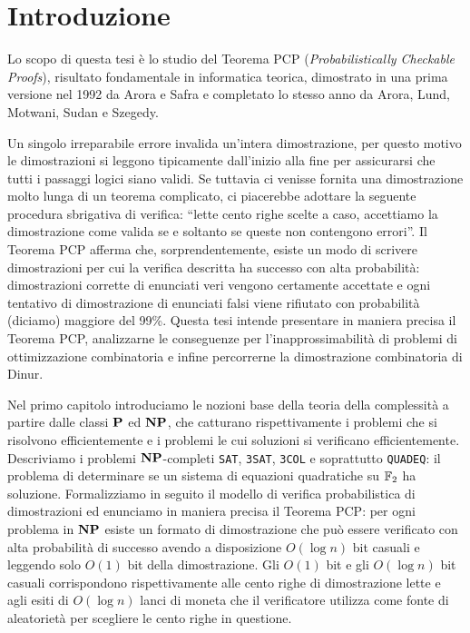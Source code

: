 \chapter*{Introduzione}

Lo scopo di questa tesi è lo studio del Teorema PCP (\emph{Probabilistically
Checkable Proofs}), risultato fondamentale in informatica teorica, dimostrato
in una prima versione nel 1992 da Arora e Safra e completato lo stesso anno da
Arora, Lund, Motwani, Sudan e Szegedy.

Un singolo irreparabile errore invalida un'intera dimostrazione,
per questo motivo le dimostrazioni si leggono tipicamente dall'inizio alla fine
per assicurarsi che tutti i passaggi logici siano validi.
Se tuttavia ci venisse fornita una dimostrazione molto lunga di un teorema
complicato, ci piacerebbe adottare la seguente procedura sbrigativa di verifica:
``lette cento righe scelte a caso, accettiamo la dimostrazione come
valida se e soltanto se queste non contengono errori''.
Il Teorema PCP afferma che, sorprendentemente, esiste un modo di scrivere
dimostrazioni per cui la verifica descritta ha successo con alta probabilità:
dimostrazioni corrette di enunciati veri vengono certamente accettate e ogni
tentativo di dimostrazione di enunciati falsi viene rifiutato con probabilità
(diciamo) maggiore del 99\%.
Questa tesi intende presentare in maniera precisa il Teorema PCP, analizzarne le
conseguenze per l'inapprossimabilità di problemi di ottimizzazione combinatoria
e infine percorrerne la dimostrazione combinatoria di Dinur.

Nel primo capitolo introduciamo le nozioni base della teoria della
complessità a partire dalle classi $\P$ ed $\NP$, che catturano
rispettivamente i problemi che si risolvono efficientemente e i problemi le cui
soluzioni si verificano efficientemente.
Descriviamo i problemi $\NP$-completi \texttt{SAT}, \texttt{3SAT},
\texttt{3COL} e soprattutto \texttt{QUADEQ}: il problema di determinare se
un sistema di equazioni quadratiche su $\F_2$ ha soluzione.
Formalizziamo in seguito il modello di verifica probabilistica di dimostrazioni
ed enunciamo in maniera precisa il Teorema PCP:
per ogni problema in $\NP$ esiste un formato di dimostrazione che
può essere verificato con alta probabilità di successo avendo a disposizione
$O(\log n)$ bit casuali e leggendo solo $O(1)$ bit della dimostrazione.
Gli $O(1)$ bit e gli $O(\log n)$ bit casuali corrispondono
rispettivamente alle cento righe di dimostrazione lette e agli esiti di
$O(\log n)$ lanci di moneta che il verificatore utilizza come fonte di
aleatorietà per scegliere le cento righe in questione.

